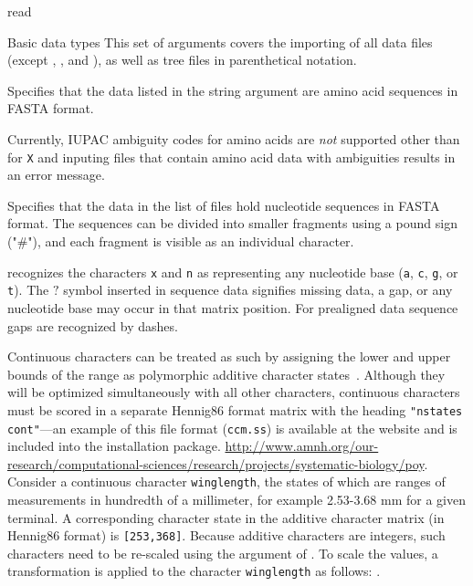 \begin{command}{read}{}
\begin{arguments}
\begin{statement}
\end{statement}

\begin{argumentgroup}{Basic data types}
This set of arguments covers the importing of all data files (except , 
,  and ),
as well as tree files in parenthetical notation.

{Specifies that the data listed in the string argument
are amino acid sequences in FASTA format.} {}

\begin{statement}
Currently, IUPAC ambiguity codes for amino acids are \emph{not}
supported other than for \texttt{X} and inputing files that contain amino acid data with
ambiguities results in an error message.
\end{statement}

{Specifies that the data in the list of files hold nucleotide
sequences in FASTA format. The sequences can be divided into smaller
fragments using a pound sign ("\#"), and each fragment is visible as an
individual character.} 
{}

\begin{statement}
\poy recognizes the characters \texttt{x} and \texttt{n} as
representing any nucleotide base (\texttt{a}, \texttt{c}, \texttt{g}, 
or \texttt{t}). The \texttt{$?$} symbol inserted in sequence data 
signifies missing data, a gap, or any nucleotide base may occur in 
that matrix position. For prealigned data sequence gaps are recognized 
by dashes.
\end{statement}

\begin{statement}
Continuous characters can be treated as such by assigning the lower
and upper bounds of the range as polymorphic additive character 
states~\cite{goloboffetal2006}.  Although they will be optimized 
simultaneously with all other characters, continuous characters 
must be scored in a separate Hennig86 format matrix with the heading 
\texttt{"nstates cont"}---an example of this file format (\texttt{ccm.ss}) 
is available at the \poy website and is included into the \poy installation package.
\url{http://www.amnh.org/our-research/computational-sciences/research/projects/systematic-biology/poy}. 
Consider a continuous character \texttt{winglength}, the states of 
which are ranges of measurements in hundredth of a millimeter, 
for example 2.53-3.68 mm for a given terminal. A corresponding 
character state in the additive character matrix (in Hennig86 format) is 
\texttt{[253,368]}. Because additive characters are integers, such 
characters need to be re-scaled using the  
argument of . To scale the values, a transformation 
is applied to the character \texttt{winglength} as follows:
.
\end{statement}


\end{argumentgroup}
\end{arguments}
\end{command}
